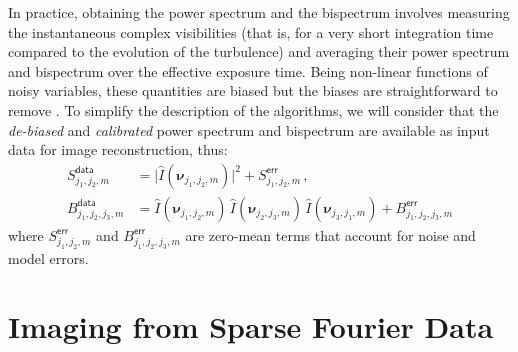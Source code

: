 \documentclass{article}
\makeatletter
\newcommand{\MathFunc}[1]{\mathop{\operator@font #1}\nolimits}
\newcommand{\Tag}[1]{\mathsf{#1}}        %
\newcommand{\V}[1]{\boldsymbol{#1}}      %
\newcommand{\FT}[1]{\hat{#1}}            %
\newcommand{\arc}{\MathFunc{arc}}        %
\newcommand{\abs}[1]{\vert #1\vert}
\newcommand{\VisPhase}{\varphi}
\newcommand{\Powerspectrum}{S}
\newcommand{\Bispectrum}{B}
\newcommand{\PhaseClosure}{\beta}
\newcommand{\Freq}{\nu}               %
\newcommand{\VFreq}{\V{\Freq}}
\newcommand{\Image}{I}
\newcommand{\DataTag}{\Tag{data}}
\newcommand{\ErrorTag}{\Tag{err}}
\makeatother
\begin{document}
In practice, obtaining the power spectrum and the bispectrum involves
measuring the instantaneous complex visibilities (that is, for a very short
integration time compared to the evolution of the turbulence) and averaging
their power spectrum and bispectrum over the effective exposure time.  Being
non-linear functions of noisy variables, these quantities are biased but the
biases are straightforward to remove \citep{Gordon_Buscher-2012-bias}.  To
simplify the description of the algorithms, we will consider that the
\emph{de-biased} and \emph{calibrated} power spectrum and bispectrum are
available as input data for image reconstruction, thus:
\begin{align}
  \Powerspectrum_{j_1,j_2,m}^\DataTag
  &= \abs{\FT{\Image}(\VFreq_{j_1,j_2,m})}^2
     + \Powerspectrum_{j_1,j_2,m}^\ErrorTag \, ,
  \label{eq:powerspectrum-data}
  \\
  \Bispectrum_{j_1,j_2,j_3,m}^\DataTag
  &= \FT{\Image}(\VFreq_{j_1,j_2,m}) \,
     \FT{\Image}(\VFreq_{j_2,j_3,m}) \,
     \FT{\Image}(\VFreq_{j_3,j_1,m})
     + \Bispectrum_{j_1,j_2,j_3,m}^\ErrorTag
  \label{eq:bispectrum-data}
\end{align}
where $\Powerspectrum_{j_1,j_2,m}^\ErrorTag$ and
$\Bispectrum_{j_1,j_2,j_3,m}^\ErrorTag$ are zero-mean terms that account for
noise and model errors.


\section{Imaging from Sparse Fourier Data}
\label{sec:image-reconstruction}
\end{document}
